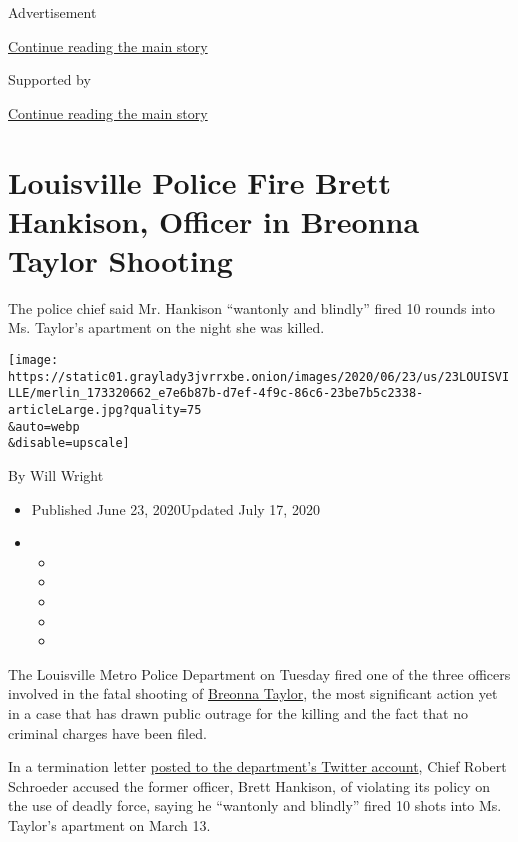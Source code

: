 Advertisement

\protect\hyperlink{after-top}{Continue reading the main story}

Supported by

\protect\hyperlink{after-sponsor}{Continue reading the main story}

\hypertarget{louisville-police-fire-brett-hankison-officer-in-breonna-taylor-shooting}{%
\section{Louisville Police Fire Brett Hankison, Officer in Breonna
Taylor
Shooting}\label{louisville-police-fire-brett-hankison-officer-in-breonna-taylor-shooting}}

The police chief said Mr. Hankison ``wantonly and blindly'' fired 10
rounds into Ms. Taylor's apartment on the night she was killed.

\texttt{[image: https://static01.graylady3jvrrxbe.onion/images/2020/06/23/us/23LOUISVILLE/merlin\_173320662\_e7e6b87b-d7ef-4f9c-86c6-23be7b5c2338-articleLarge.jpg?quality=75\\\&auto=webp\\\&disable=upscale]}

By Will Wright

\begin{itemize}
\item
  Published June 23, 2020Updated July 17, 2020
\item
  \begin{itemize}
  \item
  \item
  \item
  \item
  \item
  \end{itemize}
\end{itemize}

The Louisville Metro Police Department on Tuesday fired one of the three
officers involved in the fatal shooting of
\href{https://www.nytimes3xbfgragh.onion/article/breonna-taylor-police.html}{Breonna
Taylor}, the most significant action yet in a case that has drawn public
outrage for the killing and the fact that no criminal charges have been
filed.

In a termination letter
\href{https://twitter.com/LMPD/status/1275559612410888193?s=20}{posted
to the department's Twitter account}, Chief Robert Schroeder accused the
former officer, Brett Hankison, of violating its policy on the use of
deadly force, saying he ``wantonly and blindly'' fired 10 shots into Ms.
Taylor's apartment on March 13.

